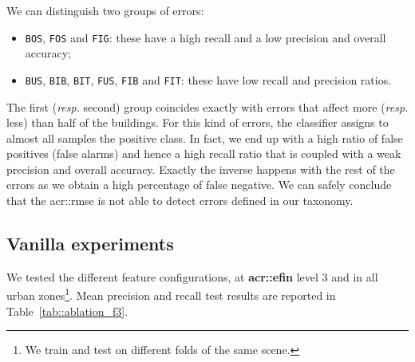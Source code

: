         We can distinguish two groups of errors: 
        \begin{itemize}[label=\(\blacktriangleright\)]
            \item \texttt{BOS}, \texttt{FOS} and \texttt{FIG}: these have a high recall and a low precision and overall accuracy;
            \item \texttt{BUS}, \texttt{BIB}, \texttt{BIT}, \texttt{FUS}, \texttt{FIB} and \texttt{FIT}: these have low recall and precision ratios.
        \end{itemize}
        The first (\textit{resp.} second) group coincides exactly with errors that affect more (\textit{resp.} less) than half of the buildings.
        For this kind of errors, the classifier assigns to almost all samples the positive class.
        In fact, we end up with a high ratio of false positives (false alarms) and hence a high recall ratio that is coupled with a weak precision and overall accuracy.
        Exactly the inverse happens with the rest of the errors as we obtain a high percentage of false negative.
        We can safely conclude that the \gls{acr::rmse} is not able to detect errors defined in our taxonomy.

    \subsection{Vanilla experiments}
        \label{subsec::experiments::baseline_feature_analysis::vanilla}
        We tested the different feature configurations, at \textbf{\gls{acr::efin}} level 3 and in all urban zones\footnote{We train and test on different folds of the same scene.}.
        Mean precision and recall test results are reported in Table~\ref{tab::ablation_f3}.

